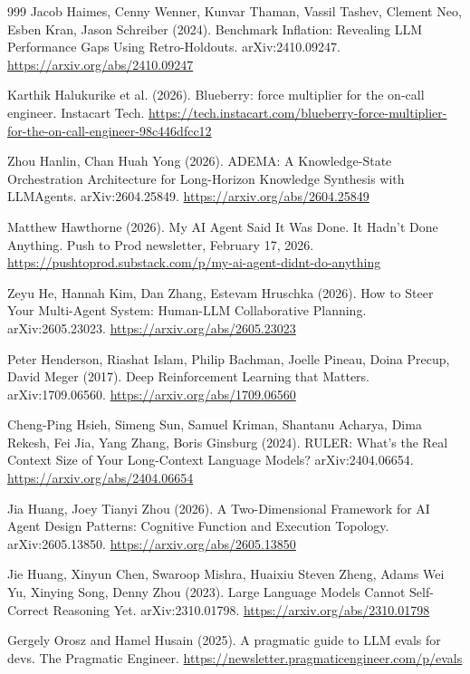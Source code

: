\begin{thebibliography}{999}
 Jacob Haimes, Cenny Wenner, Kunvar Thaman, Vassil Tashev, Clement Neo, Esben Kran, Jason Schreiber (2024). Benchmark Inflation: Revealing LLM Performance Gaps Using Retro-Holdouts. arXiv:2410.09247. \url{https://arxiv.org/abs/2410.09247}

 Karthik Halukurike et al. (2026). Blueberry: force multiplier for the on-call engineer. Instacart Tech. \url{https://tech.instacart.com/blueberry-force-multiplier-for-the-on-call-engineer-98c446dfcc12}

 Zhou Hanlin, Chan Huah Yong (2026). ADEMA: A Knowledge-State Orchestration Architecture for Long-Horizon Knowledge Synthesis with LLMAgents. arXiv:2604.25849. \url{https://arxiv.org/abs/2604.25849}

 Matthew Hawthorne (2026). My AI Agent Said It Was Done. It Hadn't Done Anything. Push to Prod newsletter, February 17, 2026. \url{https://pushtoprod.substack.com/p/my-ai-agent-didnt-do-anything}

 Zeyu He, Hannah Kim, Dan Zhang, Estevam Hruschka (2026). How to Steer Your Multi-Agent System: Human-LLM Collaborative Planning. arXiv:2605.23023. \url{https://arxiv.org/abs/2605.23023}

 Peter Henderson, Riashat Islam, Philip Bachman, Joelle Pineau, Doina Precup, David Meger (2017). Deep Reinforcement Learning that Matters. arXiv:1709.06560. \url{https://arxiv.org/abs/1709.06560}

 Cheng-Ping Hsieh, Simeng Sun, Samuel Kriman, Shantanu Acharya, Dima Rekesh, Fei Jia, Yang Zhang, Boris Ginsburg (2024). RULER: What's the Real Context Size of Your Long-Context Language Models? arXiv:2404.06654. \url{https://arxiv.org/abs/2404.06654}

 Jia Huang, Joey Tianyi Zhou (2026). A Two-Dimensional Framework for AI Agent Design Patterns: Cognitive Function and Execution Topology. arXiv:2605.13850. \url{https://arxiv.org/abs/2605.13850}

 Jie Huang, Xinyun Chen, Swaroop Mishra, Huaixiu Steven Zheng, Adams Wei Yu, Xinying Song, Denny Zhou (2023). Large Language Models Cannot Self-Correct Reasoning Yet. arXiv:2310.01798. \url{https://arxiv.org/abs/2310.01798}

 Gergely Orosz and Hamel Husain (2025). A pragmatic guide to LLM evals for devs. The Pragmatic Engineer. \url{https://newsletter.pragmaticengineer.com/p/evals}


\end{thebibliography}
